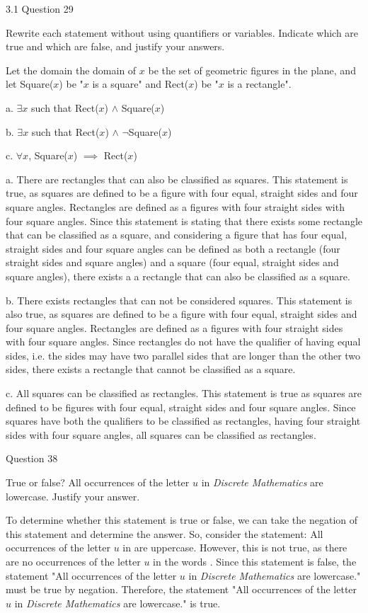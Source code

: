 \documentclass{article}
\author{Joshua Harthan}
\begin{document}
3.1 Question 29
\item[]Rewrite each statement without using quantifiers or variables. Indicate which are true and which are false, and justify your answers.
\item[]Let the domain the domain of $x$ be the set of geometric figures in the plane, and let Square($x$) be "$x$ is a square" and Rect($x$) be "$x$ is a rectangle".
\item[] a. $\exists x$ such that Rect($x$) $\land$ Square($x$)
\item[] b. $\exists x$ such that Rect($x$) $\land$ $\neg$Square($x$)
\item[] c. $\forall x$, Square($x$) $\implies$ Rect($x$)
\item[] a. There are rectangles that can also be classified as squares. This statement is true, as squares are defined to be a figure with four equal, straight sides and four square angles. Rectangles are defined as a figures with four straight sides with four square angles. Since this statement is stating that there exists some rectangle that can be classified as a square, and considering a figure that has four equal, straight sides and four square angles can be defined as both a rectangle (four straight sides and square angles) and a square (four equal, straight sides and square angles), there exists a a rectangle that can also be classified as a square.
\item[] b. There exists rectangles that can not be considered squares. This statement is also true, as squares are defined to be a figure with four equal, straight sides and four square angles. Rectangles are defined as a figures with four straight sides with four square angles. Since rectangles do not have the qualifier of having equal sides, i.e. the sides may have two parallel sides that are longer than the other two sides, there exists a rectangle that cannot be classified as a square.
\item[] c. All squares can be classified as rectangles. This statement is true as squares are defined to be figures with four equal, straight sides and four square angles. Since squares have both the qualifiers to be classified as rectangles, having four straight sides with four square angles, all squares can be classified as rectangles. 


\clearpage
{} Question 38
\item[]True or false? All occurrences of the letter $u$ in \textit{Discrete Mathematics} are lowercase. Justify your answer.
\item[]To determine whether this statement is true or false, we can take the negation of this statement and determine the answer. So, consider the statement: All occurrences of the letter $u$ in  are uppercase. However, this is not true, as there are no occurrences of the letter $u$ in the words . Since this statement is false, the statement "All occurrences of the letter $u$ in \textit{Discrete Mathematics} are lowercase." must be true by negation. Therefore, the statement "All occurrences of the letter $u$ in \textit{Discrete Mathematics} are lowercase." is true.
\end{document}
